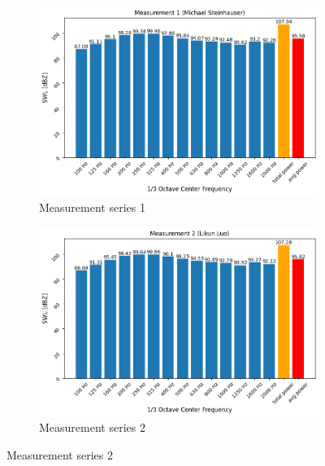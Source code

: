 \begin{figure}[H]
     \centering
     \begin{subfigure}[b]{0.9\textwidth}
         \centering
         \includegraphics[width=\linewidth]{fig/SWL_1.png}
         \caption{Measurement series 1}
     \end{subfigure}
     \par\bigskip
     \begin{subfigure}[b]{0.9\textwidth}
         \centering
         \includegraphics[width=\linewidth]{fig/SWL_2.png}
         \caption{Measurement series 2}
     \end{subfigure}
\end{figure}

